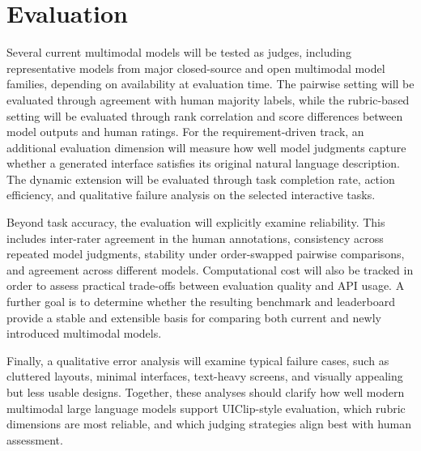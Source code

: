 \documentclass[pdflatex,sn-mathphys-num]{sn-jnl}
\begin{document}
\section{Evaluation}\label{sec:evaluation}

Several current multimodal models will be tested as judges, including representative
models from major closed-source and open multimodal model families, depending on
availability at evaluation time. The pairwise setting will be evaluated through
agreement with human majority labels, while the rubric-based setting will be evaluated
through rank correlation and score differences between model outputs and human ratings.
For the requirement-driven track, an additional evaluation dimension will measure how
well model judgments capture whether a generated interface satisfies its original
natural language description. The dynamic extension will be evaluated through task
completion rate, action efficiency, and qualitative failure analysis on the selected
interactive tasks.

Beyond task accuracy, the evaluation will explicitly examine reliability. This includes
inter-rater agreement in the human annotations, consistency across repeated model
judgments, stability under order-swapped pairwise comparisons, and agreement across
different models. Computational cost will also be tracked in order to assess practical
trade-offs between evaluation quality and API usage. A further goal is to determine
whether the resulting benchmark and leaderboard provide a stable and extensible basis
for comparing both current and newly introduced multimodal models.

Finally, a qualitative error analysis will examine typical failure cases, such as
cluttered layouts, minimal interfaces, text-heavy screens, and visually appealing but
less usable designs. Together, these analyses should clarify how well modern
multimodal large language models support UIClip-style evaluation, which rubric
dimensions are most reliable, and which judging strategies align best with human
assessment.

\backmatter

{\footnotesize\setlength{\bibsep}{0pt}}
\end{document}
